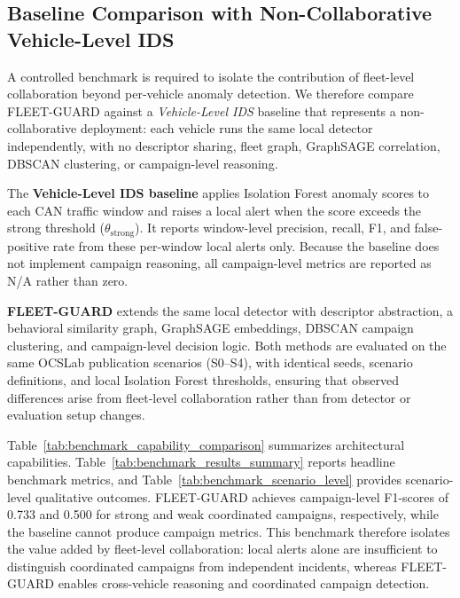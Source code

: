\subsection{Baseline Comparison with Non-Collaborative Vehicle-Level IDS}
\label{subsec:non_collaborative_baseline}

A controlled benchmark is required to isolate the contribution of fleet-level collaboration beyond per-vehicle anomaly detection.
We therefore compare FLEET-GUARD against a \emph{Vehicle-Level IDS} baseline that represents a non-collaborative deployment: each vehicle runs the same local detector independently, with no descriptor sharing, fleet graph, GraphSAGE correlation, DBSCAN clustering, or campaign-level reasoning.

The \textbf{Vehicle-Level IDS baseline} applies Isolation Forest anomaly scores to each CAN traffic window and raises a local alert when the score exceeds the strong threshold ($\theta_{\mathrm{strong}}$).
It reports window-level precision, recall, F1, and false-positive rate from these per-window local alerts only.
Because the baseline does not implement campaign reasoning, all campaign-level metrics are reported as N/A rather than zero.

\textbf{FLEET-GUARD} extends the same local detector with descriptor abstraction, a behavioral similarity graph, GraphSAGE embeddings, DBSCAN campaign clustering, and campaign-level decision logic.
Both methods are evaluated on the same OCSLab publication scenarios (S0--S4), with identical seeds, scenario definitions, and local Isolation Forest thresholds, ensuring that observed differences arise from fleet-level collaboration rather than from detector or evaluation setup changes.

Table~\ref{tab:benchmark_capability_comparison} summarizes architectural capabilities.
Table~\ref{tab:benchmark_results_summary} reports headline benchmark metrics, and Table~\ref{tab:benchmark_scenario_level} provides scenario-level qualitative outcomes.
FLEET-GUARD achieves campaign-level F1-scores of 0.733 and 0.500 for strong and weak coordinated campaigns, respectively, while the baseline cannot produce campaign metrics.
This benchmark therefore isolates the value added by fleet-level collaboration: local alerts alone are insufficient to distinguish coordinated campaigns from independent incidents, whereas FLEET-GUARD enables cross-vehicle reasoning and coordinated campaign detection.
